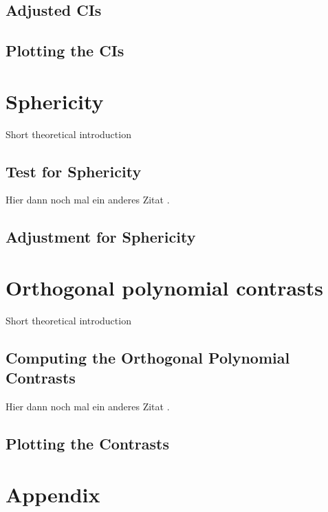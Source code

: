 \documentclass[11pt]{article}
\begin{document}
		\subsection{Adjusted CIs}
		
		\subsection{Plotting the CIs}
		
	\section{Sphericity}
	Short theoretical introduction
		\subsection{Test for Sphericity}
		Hier dann noch mal ein anderes Zitat \citep{003}.
		\subsection{Adjustment for Sphericity}
	
	\section{Orthogonal polynomial contrasts}
	Short theoretical introduction
		\subsection{Computing the Orthogonal Polynomial Contrasts}
		Hier dann noch mal ein anderes Zitat \citep{003}.
		\subsection{Plotting the Contrasts}
	

 
	\section*{Appendix}
	\newpage
 
 
 
	
\end{document}
